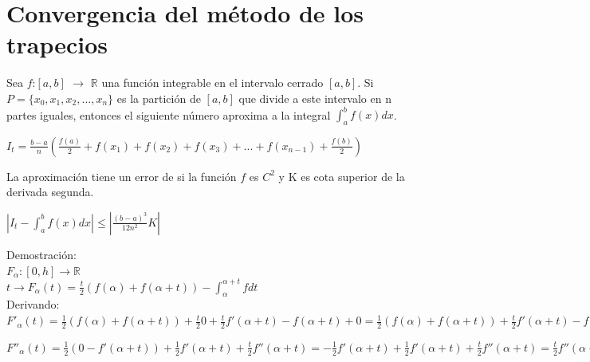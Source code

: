 \documentclass{beamer}
\begin{document}
\section{Convergencia del método de los trapecios}
\begin{frame}
  \begin {theorem}
    Sea $f$:$[a,b]$ $\rightarrow$ $\mathbb{R}$ una función integrable en el intervalo cerrado $[a,b]$. Si $P=\{x_0,x_1,x_2,...,x_n\}$ es la partición de $[a,b]$ que divide a este intervalo en n partes iguales, entonces el siguiente número aproxima a la integral $\int_a^bf(x)dx$.

    $I_t= \frac{b-a}{n}\left( \frac{f(a)}{2} + f(x_1)+f(x_2)+f(x_3)+...+f(x_{n-1})+\frac{f(b)} {2} \right)$

    La aproximación tiene un error de si la función $f$ es $C^2$ y K es cota superior de la derivada segunda.

    $|I_t-\int_a^bf(x)dx|\leq |\frac {(b-a)^3} {12n^2} K|$
  \end {theorem}
\end{frame}

\begin {frame}
  Demostración:\\
  $F_\alpha :[0,h]\rightarrow \mathbb{R}$\\
  $t\rightarrow F_\alpha(t)=\frac{t}{2} \left(f(\alpha)+f(\alpha+t) \right)-\int_\alpha ^{\alpha+t} f dt$\\
  \pause
  Derivando:\\
  $F'_\alpha(t)=\frac{1}{2}\left(f(\alpha)+f(\alpha+t) \right) +\frac{t}{2} 0 + \frac{t}{2} f'(\alpha+t)  -f(\alpha+t) +0=\frac{1}{2}\left(f(\alpha)+f(\alpha+t) \right)+ \frac{t}{2} f'(\alpha+t)  -f(\alpha+t)=\frac {1}{2} \left(f(\alpha)-f(\alpha+t) \right)+ \frac{t}{2} f'(\alpha+t)$\\
  \pause

  $F''_\alpha(t)=\frac {1}{2} \left(0-f'(\alpha+t) \right)+ \frac{1}{2} f'(\alpha+t)+\frac{t}{2}f''(\alpha+t)=-\frac {1}{2} f'(\alpha+t) + \frac{1}{2} f'(\alpha+t)+\frac{t}{2}f''(\alpha+t)=\frac{t}{2}f''(\alpha+t)$\\

\end{frame}
\end{document}
